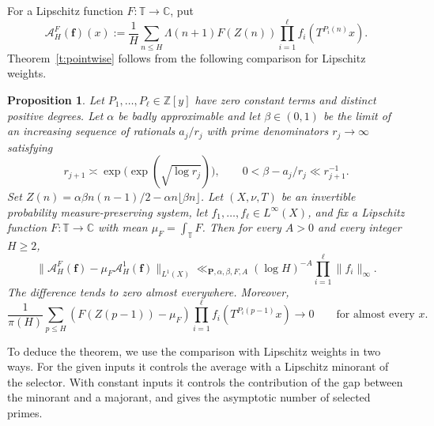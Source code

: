 \documentclass[12pt]{amsart}
\newcommand{\1}{\mathbf 1}
\newtheorem{proposition}[theorem]{Proposition}
\theoremstyle{definition}
\begin{document}
For a Lipschitz function \(F:\mathbb T\to\mathbb C\), put
\[
 \mathcal A_H^F(\mathbf f)(x)
 :=\frac1H\sum_{n\le H}\Lambda(n+1)F(Z(n))
       \prod_{i=1}^{\ell} f_i(T^{P_i(n)}x).
\]
Theorem~\ref{t:pointwise} follows from the following comparison for
Lipschitz weights.

\begin{proposition}\label{p:ergodic-comparison}
Let $P_1,\ldots,P_\ell\in\mathbb Z[y]$ have zero constant terms
and distinct positive degrees. Let $\alpha$ be badly approximable
and let $\beta\in(0,1)$ be the limit of an increasing sequence
of rationals $a_j/r_j$ with prime denominators $r_j\to\infty$
satisfying
\[
 r_{j+1}\asymp\exp\!\bigl(\exp(\sqrt{\log r_j})\bigr),
 \qquad 0<\beta-a_j/r_j\ll r_{j+1}^{-1}.
\]
Set $Z(n)=\alpha\beta n(n-1)/2-\alpha n\lfloor\beta n\rfloor$.
Let $(X,\nu,T)$ be an invertible probability measure-preserving
system, let $f_1,\ldots,f_\ell\in L^\infty(X)$, and fix a Lipschitz
function $F:\mathbb T\to\mathbb C$ with mean
$\mu_F=\int_{\mathbb T}F$. Then for every $A>0$ and every integer
$H\geq2$,
\begin{equation}\label{e:ergodic-L1-log}
 \|\mathcal A_H^F(\mathbf f)-\mu_F\mathcal A_H^1(\mathbf f)\|_{L^1(X)}
 \ll_{\mathbf P,\alpha,\beta,F,A}
       (\log H)^{-A}\prod_{i=1}^{\ell}\|f_i\|_\infty.
\end{equation}
The difference tends to zero almost everywhere. Moreover,
\begin{equation}\label{e:smooth-prime-comparison}
 \frac1{\pi(H)}\sum_{p\le H}
 (F(Z(p-1))-\mu_F)\prod_{i=1}^{\ell} f_i(T^{P_i(p-1)}x)
 \longrightarrow 0
 \qquad\text{for almost every }x.
\end{equation}
\end{proposition}

To deduce the theorem, we use the comparison with Lipschitz
weights in two ways. For the given inputs it controls the average
with a Lipschitz minorant of the selector. With constant inputs
it controls the contribution of the gap between the minorant and
a majorant, and gives the asymptotic number of selected primes.
\end{document}
